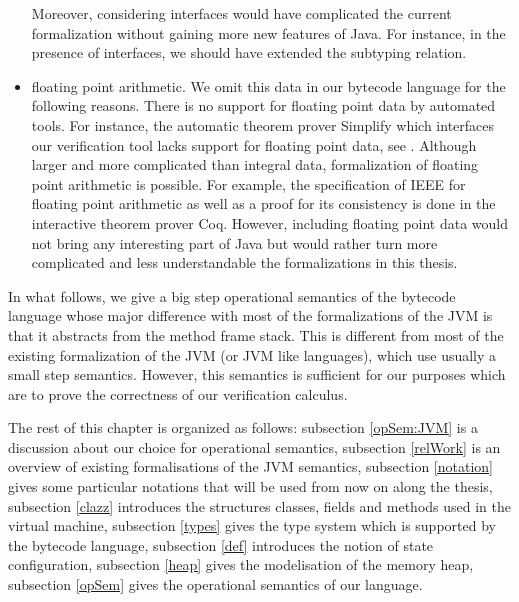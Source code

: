 \begin{itemize}
	 Moreover, considering interfaces would have complicated the current formalization 
	 without gaining more new features of Java. 
	 For instance, in the presence of interfaces, we should have extended 
	 the subtyping relation. 


   \item floating point arithmetic. We omit this data in our bytecode language for the following reasons.
	 There is no support for floating point data by automated tools.  
	 For instance, the automatic theorem prover Simplify which interfaces our verification tool
	 lacks support for floating point data, see  \cite{ESC2000LNS}. 
	 Although larger and more complicated than integral data, formalization of floating point arithmetic is possible. 
	 For example, the specification of IEEE  for floating point
	 arithmetic as well as a proof for its consistency  is done in the interactive
	 theorem prover Coq. 
	 However, including floating point data would not
	 bring any interesting part of Java but would rather turn more complicated
	 and less understandable the formalizations in this thesis.
	  
	  
	 
	 
   
         
 \end{itemize}

 

 In what follows, we give a big step operational semantics of the bytecode language whose major difference with most of the formalizations
 of the JVM is that it abstracts from the method frame stack. This is different from most of the existing formalization of the JVM (or JVM like languages),
 which use usually a small step semantics. However, this semantics
 is sufficient for our purposes which are to prove the correctness of our verification calculus.  


  
 The rest of this chapter is organized as follows:
 subsection \ref{opSem:JVM} is a discussion about our choice for operational semantics,
 subsection \ref{relWork} is an overview of existing formalisations of the JVM semantics,
 subsection \ref{notation} gives some particular notations that will be used from now on along the thesis,
 subsection \ref{clazz} introduces the structures classes, fields and methods  used in the virtual machine, 
 subsection \ref{types} gives the type system which is supported by the bytecode language,
 subsection \ref{def} introduces the notion of state configuration,
 subsection \ref{heap} gives the modelisation of the memory heap,
 subsection \ref{opSem} gives the operational semantics of our language.

